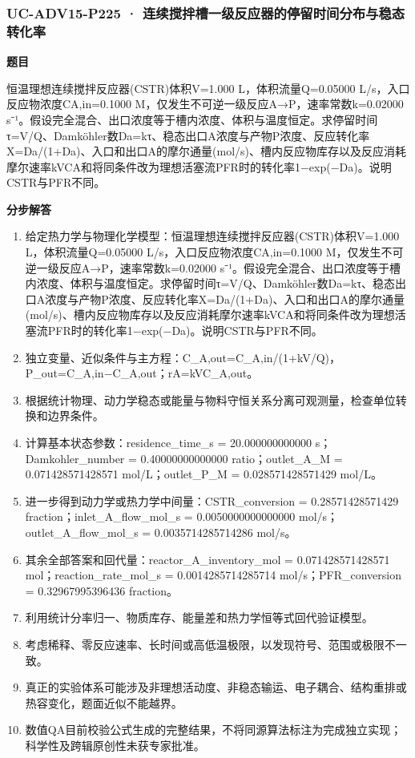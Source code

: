 \documentclass[UTF8,11pt,a4paper]{ctexart}
\begin{document}
\subsubsection*{UC-ADV15-P225 · 连续搅拌槽一级反应器的停留时间分布与稳态转化率}
\noindent\textbf{题目}\par
恒温理想连续搅拌反应器(CSTR)体积V=1.000 L，体积流量Q=0.05000 L/s，入口反应物浓度CA,in=0.1000 M，仅发生不可逆一级反应A→P，速率常数k=0.02000 s⁻¹。假设完全混合、出口浓度等于槽内浓度、体积与温度恒定。求停留时间τ=V/Q、Damköhler数Da=kτ、稳态出口A浓度与产物P浓度、反应转化率X=Da/(1+Da)、入口和出口A的摩尔通量(mol/s)、槽内反应物库存以及反应消耗摩尔速率kVCA和将同条件改为理想活塞流PFR时的转化率1−exp(−Da)。说明CSTR与PFR不同。\par
\medskip\noindent\textbf{分步解答}
\begin{enumerate}
\item 给定热力学与物理化学模型：恒温理想连续搅拌反应器(CSTR)体积V=1.000 L，体积流量Q=0.05000 L/s，入口反应物浓度CA,in=0.1000 M，仅发生不可逆一级反应A→P，速率常数k=0.02000 s⁻¹。假设完全混合、出口浓度等于槽内浓度、体积与温度恒定。求停留时间τ=V/Q、Damköhler数Da=kτ、稳态出口A浓度与产物P浓度、反应转化率X=Da/(1+Da)、入口和出口A的摩尔通量(mol/s)、槽内反应物库存以及反应消耗摩尔速率kVCA和将同条件改为理想活塞流PFR时的转化率1−exp(−Da)。说明CSTR与PFR不同。
\item 独立变量、近似条件与主方程：C\_A,out=C\_A,in/(1+kV/Q)，P\_out=C\_A,in−C\_A,out；rA=kVC\_A,out。
\item 根据统计物理、动力学稳态或能量与物料守恒关系分离可观测量，检查单位转换和边界条件。
\item 计算基本状态参数：residence\_time\_s = 20.000000000000 s；Damkohler\_number = 0.40000000000000 ratio；outlet\_A\_M = 0.071428571428571 mol/L；outlet\_P\_M = 0.028571428571429 mol/L。
\item 进一步得到动力学或热力学中间量：CSTR\_conversion = 0.28571428571429 fraction；inlet\_A\_flow\_mol\_s = 0.0050000000000000 mol/s；outlet\_A\_flow\_mol\_s = 0.0035714285714286 mol/s。
\item 其余全部答案和回代量：reactor\_A\_inventory\_mol = 0.071428571428571 mol；reaction\_rate\_mol\_s = 0.0014285714285714 mol/s；PFR\_conversion = 0.32967995396436 fraction。
\item 利用统计分率归一、物质库存、能量差和热力学恒等式回代验证模型。
\item 考虑稀释、零反应速率、长时间或高低温极限，以发现符号、范围或极限不一致。
\item 真正的实验体系可能涉及非理想活动度、非稳态输运、电子耦合、结构重排或热容变化，题面近似不能越界。
\item 数值QA目前校验公式生成的完整结果，不将同源算法标注为完成独立实现；科学性及跨辑原创性未获专家批准。
\end{enumerate}
\end{document}
